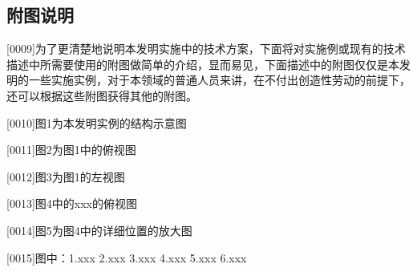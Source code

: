 \documentclass[hyperref]{ctexart}
\begin{document}
	\subsection*{附图说明}
	
	\begin{flushleft}
		{\large 	[0009]\quad 为了更清楚地说明本发明实施中的技术方案，下面将对实施例或现有的技术描述中所需要使用的附图做简单的介绍，显而易见，下面描述中的附图仅仅是本发明的一些实施实例，对于本领域的普通人员来讲，在不付出创造性劳动的前提下，还可以根据这些附图获得其他的附图。
			
			[0010]\quad 图1为本发明实例的结构示意图
			
			[0011]\quad 图2为图1中的俯视图
			
			[0012]\quad 图3为图1的左视图
			
			[0013]\quad 图4中的xxx的俯视图
			
			[0014]\quad 图5为图4中的详细位置的放大图
			
			[0015]\quad 图中：1.xxx 2.xxx 3.xxx 4.xxx 5.xxx 6.xxx }
	\end{flushleft}
	
\end{document}
